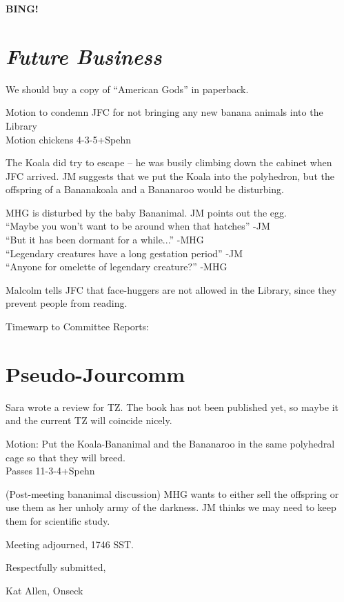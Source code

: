 \documentclass[10pt]{article}
\newcommand{\bing}{{\bf BING!} }
\newcommand{\goto}[1]{\bing \vskip 12pt \section*{{\em{#1}}}}
\begin{document}
\goto{Future Business}
We should buy a copy of ``American Gods'' in paperback.

Motion to condemn JFC for not bringing any new banana animals into the
Library\\
Motion chickens 4-3-5+Spehn

The Koala did try to escape -- he was busily climbing down the cabinet
when JFC arrived.  JM suggests that we put the Koala into the
polyhedron, but the offspring of a Bananakoala and a Bananaroo would
be disturbing.

MHG is disturbed by the baby Bananimal.  JM points out the egg.\\
``Maybe you won't want to be around when that hatches'' -JM\\
``But it has been dormant for a while...'' -MHG\\
``Legendary creatures have a long gestation period'' -JM\\
``Anyone for omelette of legendary creature?'' -MHG

Malcolm tells JFC that face-huggers are not allowed in the Library,
since they prevent people from reading. 

Timewarp to Committee Reports:\\
\section*{Pseudo-Jourcomm}

Sara wrote a review for TZ.  The book has not been published yet, so
maybe it and the current TZ will coincide nicely.

Motion: Put the Koala-Bananimal and the Bananaroo in the same
polyhedral cage so that they will breed. \\
Passes 11-3-4+Spehn

(Post-meeting bananimal discussion) MHG wants to either sell the
offspring or use them as her unholy army of the darkness. JM thinks we
may need to keep them for scientific study.

\vspace{12pt}

\noindent
Meeting adjourned, 1746 SST.

\vspace{18pt}

\centerline{Respectfully submitted,}
\centerline{Kat Allen,  Onseck}
\end{document}
